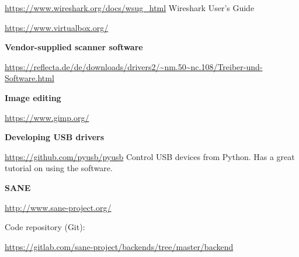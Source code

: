 \documentclass{article}
\begin{document}
\begin{thebibliography}{}
  \url{https://www.wireshark.org/docs/wsug_html}
  Wireshark User's Guide

  \url{https://www.virtualbox.org/}

  \item[]\hspace{-\labelwidth}\hspace{-\labelsep}\textbf{Vendor-supplied scanner software}

  \url{https://reflecta.de/de/downloads/drivers2/~nm.50~nc.108/Treiber-und-Software.html}

  \item[]\hspace{-\labelwidth}\hspace{-\labelsep}\textbf{Image editing}

  \url{https://www.gimp.org/}

  \item[]\hspace{-\labelwidth}\hspace{-\labelsep}\textbf{Developing USB drivers}

  \url{https://github.com/pyusb/pyusb} Control USB devices from Python.
  Has a great tutorial on using the software.
  
  \item[]\hspace{-\labelwidth}\hspace{-\labelsep}\textbf{SANE}
  
  \url{http://www.sane-project.org/}
  
  \item[]\hspace{-\labelwidth}\hspace{-\labelsep} Code repository (Git):
  
  \url{https://gitlab.com/sane-project/backends/tree/master/backend}
\end{thebibliography}
\end{document}

